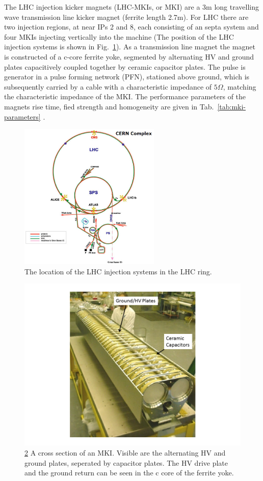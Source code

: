 The LHC injection kicker magnets (LHC-MKIs, or MKI) are a 3m long travelling wave transmission line kicker magnet (ferrite length 2.7m). For LHC there are two injection regions, at near IPs 2 and 8, each consisting of an septa system and four MKIs injecting vertically into the machine (The position of the LHC injection systems is shown in Fig.~\ref{fig:lhc-injection-systems}). As a transmission line magnet the magnet is constructed of a c-core ferrite yoke, segmented by alternating HV and ground plates capacitively coupled together by ceramic capacitor plates. The pulse is generator in a pulse forming network (PFN), stationed above ground, which is subsequently carried by a cable with a characteristic impedance of $5 \Omega$, matching the characteristic impedance of the MKI. The performance parameters of the magnets rise time, fied strength and homogeneity are given in Tab.~\ref{tab:mki-parameters} \cite{Ducimetière:mkiSpec}.

\begin{figure}
\begin{center}
\includegraphics[width=0.6\textwidth]{LHC_MKI/figures/injection-points-lhc.png}
\end{center}
\label{fig:lhc-injection-systems}
\caption{The location of the LHC injection systems in the LHC ring.}
\end{figure}


\begin{figure}
\begin{center}
\includegraphics[height=0.4\textwidth]{LHC_MKI/figures/mki-out-vac-tank.png}
\end{center}
\label{fig:lhc-mki-cross-section}
\caption{\ref{fig:lhc-mki-cross-section} A cross section of an MKI. Visible are the alternating HV and ground plates, seperated by capacitor plates. The HV drive plate and the ground return can be seen in the c core of the ferrite yoke.}
\end{figure}

